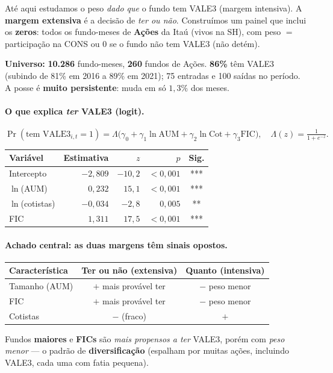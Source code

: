\documentclass[11pt]{article}
\begin{document}
Até aqui estudamos o peso \emph{dado que} o fundo tem VALE3 (margem intensiva). A
\textbf{margem extensiva} é a decisão de \emph{ter ou não}. Construímos um painel que
inclui os \textbf{zeros}: todos os fundo-meses de \textbf{Ações} da Itaú (vivos na SH),
com peso $=$ participação na CONS ou $0$ se o fundo não tem VALE3 (não detém).

\medskip
\noindent\textbf{Universo:} \textbf{10.286} fundo-meses, \textbf{260} fundos de Ações.
\textbf{86\%} têm VALE3 (subindo de 81\% em 2016 a 89\% em 2021); 75 entradas e 100
saídas no período. A posse é \textbf{muito persistente}: muda em só $1{,}3\%$ dos meses.

\paragraph{O que explica \emph{ter} VALE3 (logit).}
\begin{equation}
\Pr(\text{tem VALE3}_{i,t}=1) = \Lambda\!\big(\gamma_0 + \gamma_1\ln\text{AUM} + \gamma_2\ln\text{Cot} + \gamma_3\text{FIC}\big),
\quad \Lambda(z)=\tfrac{1}{1+e^{-z}}.
\end{equation}
\begin{table}[h]\centering
\begin{tabular}{@{}lrrrc@{}}
\toprule
Variável & Estimativa & $z$ & $p$ & Sig. \\
\midrule
Intercepto      & $-2{,}809$ & $-10{,}2$ & $<0{,}001$ & *** \\
$\ln$(AUM)      & $0{,}232$  & $15{,}1$  & $<0{,}001$ & *** \\
$\ln$(cotistas) & $-0{,}034$ & $-2{,}8$  & $0{,}005$  & ** \\
FIC             & $1{,}311$  & $17{,}5$  & $<0{,}001$ & *** \\
\bottomrule
\end{tabular}
\end{table}

\paragraph{Achado central: as duas margens têm sinais opostos.}
\begin{table}[h]\centering
\begin{tabular}{@{}lcc@{}}
\toprule
Característica & \textbf{Ter ou não} (extensiva) & \textbf{Quanto} (intensiva) \\
\midrule
Tamanho (AUM) & $+$ mais provável ter & $-$ peso menor \\
FIC           & $+$ mais provável ter & $-$ peso menor \\
Cotistas      & $-$ (fraco)           & $+$ \\
\bottomrule
\end{tabular}
\end{table}
\noindent Fundos \textbf{maiores} e \textbf{FICs} são \emph{mais propensos a ter} VALE3,
porém com \emph{peso menor} --- o padrão de \textbf{diversificação} (espalham por muitas
ações, incluindo VALE3, cada uma com fatia pequena).
\end{document}
